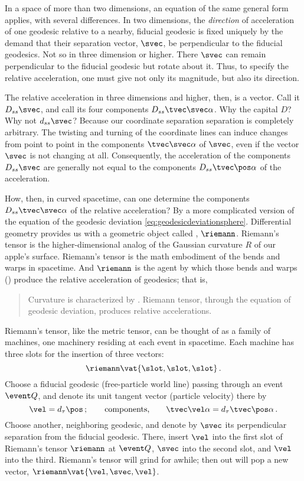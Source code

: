In a space of more than two dimensions, an equation of the same general form applies, with several differences. In two dimensions, the \emph{direction} of acceleration of one geodesic relative to a nearby, fiducial geodesic is fixed uniquely by the demand that their separation vector, $\svec$, be perpendicular to the fiducial geodesics. Not so in three dimension or higher. There $\svec$ can remain perpendicular to the fiducial geodesic but rotate about it. Thus, to specify the relative acceleration, one must give not only its magnitude, but also its direction.

The relative acceleration in three dimensions and higher, then, is a vector. Call it $D_{ss}\svec$, and call its four components $D_{ss}\tvec\svec\alpha$. Why the capital $D$? Why not $d_{ss}\svec$? Because our coordinate separation separation is completely arbitrary. The twisting and turning of the coordinate lines can induce changes from point to point in the components $\tvec\svec\alpha$ of $\svec$, even if the vector $\svec$ is not changing at all. Consequently, the acceleration of the components $D_{ss}\svec$ are generally not equal to the components $D_{ss}\tvec\pos\alpha$ of the acceleration.

How, then, in curved spacetime, can one determine the components $D_{ss}\tvec\svec\alpha$ of the relative acceleration? By a more complicated version of the equation of the geodesic deviation \cref{eq:geodesicdeviationsphere}. Differential geometry provides us with a geometric object called , $\riemann$. Riemann's tensor is the higher-dimensional analog of the Gaussian curvature $R$ of our apple's surface. Riemann's tensor is the math embodiment of the bends and warps in spacetime. And $\riemann$ is the agent by which those bends and warps () produce the relative acceleration of geodesics; that is,
%
\begin{quotation}
  Curvature is characterized by . Riemann tensor, through the equation of geodesic deviation, produces relative accelerations.
\end{quotation}
%
Riemann's tensor, like the metric tensor, can be thought of as a family of machines, one machinery residing at each event in spacetime. Each machine has three slots for the insertion of three vectors:
%
\begin{equation*}
  \riemann\vat{\slot,\slot,\slot}\,.
\end{equation*}
%
Choose a fiducial geodesic (free-particle world line) passing through an event $\event Q$, and denote its unit tangent vector (particle velocity) there by
%
\begin{equation*}
  \vel = d_\tau\pos\,;\qquad\text{components,}\qquad \tvec\vel\alpha = d_\tau\tvec\pos\alpha\,.
\end{equation*}
%
Choose another, neighboring geodesic, and denote by $\svec$ its perpendicular separation from the fiducial geodesic. There, insert $\vel$ into the first slot of Riemann's tensor $\riemann$ at $\event Q$, $\svec$ into the second slot, and $\vel$ into the third. Riemann's tensor will grind for awhile; then out will pop a new vector, $\riemann\vat{\vel,\svec,\vel}$.

